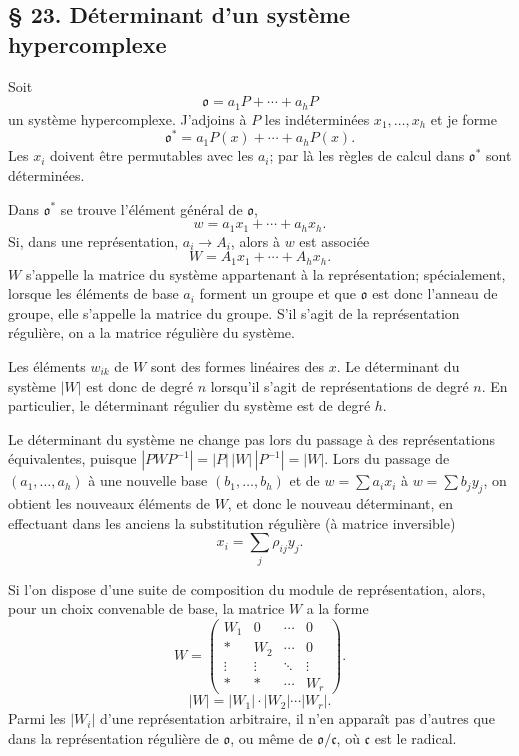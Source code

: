 
\providecommand{\mo}{\mathfrak{o}}
\providecommand{\mc}{\mathfrak{c}}
\providecommand{\ml}{\mathfrak{l}}

\subsection*{\S{} 23. Déterminant d'un système hypercomplexe}
Soit
\[
        \mo=a_1P+\cdots+a_hP
\]
un système hypercomplexe. J'adjoins à $P$ les indéterminées $x_1,\ldots,x_h$ et je forme
\[
        \mo^*=a_1P(x)+\cdots+a_hP(x).
\]
Les $x_i$ doivent être permutables avec les $a_i$; par là les règles de calcul dans $\mo^*$ sont déterminées.

Dans $\mo^*$ se trouve l'élément général de $\mo$,
\[
        w=a_1x_1+\cdots+a_hx_h.
\]
Si, dans une représentation, $a_i\to A_i$, alors à $w$ est associée
\[
        W=A_1x_1+\cdots+A_hx_h.
\]
$W$ s'appelle la matrice du système appartenant à la représentation; spécialement, lorsque les éléments de base $a_i$ forment un groupe et que $\mo$ est donc l'anneau de groupe, elle s'appelle la matrice du groupe. S'il s'agit de la représentation régulière, on a la matrice régulière du système.

Les éléments $w_{ik}$ de $W$ sont des formes linéaires des $x$. Le déterminant du système $|W|$ est donc de degré $n$ lorsqu'il s'agit de représentations de degré $n$. En particulier, le déterminant régulier du système est de degré $h$.

Le déterminant du système ne change pas lors du passage à des représentations équivalentes, puisque $|PWP^{-1}|=|P|\,|W|\,|P^{-1}|=|W|$. Lors du passage de $(a_1,\ldots,a_h)$ à une nouvelle base $(b_1,\ldots,b_h)$ et de $w=\sum a_ix_i$ à $w=\sum b_jy_j$, on obtient les nouveaux éléments de $W$, et donc le nouveau déterminant, en effectuant dans les anciens la substitution régulière (à matrice inversible)
\[
        x_i=\sum_j\rho_{ij}y_j.
\]

Si l'on dispose d'une suite de composition du module de représentation, alors, pour un choix convenable de base, la matrice $W$ a la forme
\[
        W=\begin{pmatrix}
        W_1&0&\cdots&0\\
        *&W_2&\cdots&0\\
        \vdots&\vdots&\ddots&\vdots\\
        *&*&\cdots&W_r
        \end{pmatrix}.
\]
\[
        |W|=|W_1|\cdot|W_2|\cdots|W_r|.
\]
Parmi les $|W_i|$ d'une représentation arbitraire, il n'en apparaît pas d'autres que dans la représentation régulière de $\mo$, ou même de $\mo/\mc$, où $\mc$ est le radical.

